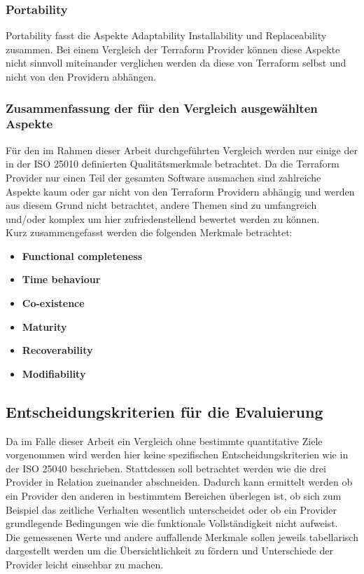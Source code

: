 \subsubsection{Portability}

Portability fasst die Aspekte Adaptability Installability und
Replaceability zusammen. Bei einem Vergleich der Terraform Provider
können diese Aspekte nicht sinnvoll miteinander verglichen werden da
diese von Terraform selbst und nicht von den Providern abhängen.


\subsubsection{Zusammenfassung der für den Vergleich ausgewählten Aspekte}

Für den im Rahmen dieser Arbeit durchgeführten Vergleich werden nur
einige der in der ISO 25010 definierten Qualitätsmerkmale betrachtet.
Da die Terraform Provider nur einen Teil der gesamten Software ausmachen
sind zahlreiche Aspekte kaum oder gar nicht von den Terraform Providern
abhängig und werden aus diesem Grund nicht betrachtet, andere Themen
sind zu umfangreich und/oder komplex um hier zufriedenstellend
bewertet werden zu können.\\
Kurz zusammengefasst werden die folgenden Merkmale betrachtet:

\begin{itemize}
  \item \textbf{Functional completeness}
  \item \textbf{Time behaviour}
  \item \textbf{Co-existence}
  \item \textbf{Maturity}
  \item \textbf{Recoverability}
  \item \textbf{Modifiability}
\end{itemize}

\subsection{Entscheidungskriterien für die Evaluierung}

Da im Falle dieser Arbeit ein Vergleich ohne bestimmte quantitative
Ziele vorgenommen wird werden hier keine spezifischen
Entscheidungskriterien wie in der ISO 25040 beschrieben. Stattdessen
soll betrachtet werden wie die drei Provider in Relation zueinander
abschneiden. Dadurch kann ermittelt werden ob ein Provider den anderen
in bestimmtem Bereichen überlegen ist, ob sich zum Beispiel das
zeitliche Verhalten wesentlich unterscheidet oder ob ein Provider
grundlegende Bedingungen wie die funktionale Vollständigkeit nicht
aufweist.\\
Die gemessenen Werte und andere auffallende Merkmale sollen jeweils
tabellarisch dargestellt werden um die Übersichtlichkeit zu fördern
und Unterschiede der Provider leicht einsehbar zu machen.

